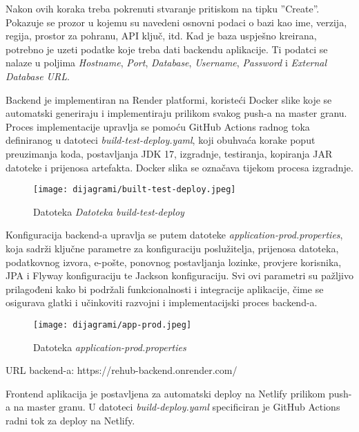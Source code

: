 			\eject
			
			Nakon ovih koraka treba pokrenuti stvaranje pritiskom na tipku ”Create”.
			Pokazuje se prozor u kojemu su navedeni osnovni podaci o bazi kao ime, verzija, regija, prostor za pohranu, API ključ, itd.
			Kad je baza uspješno kreirana, potrebno je uzeti podatke koje treba dati backendu aplikacije. Ti podatci se nalaze u poljima \textit{Hostname}, \textit{Port}, \textit{Database}, \textit{Username}, \textit{Password} i \textit{External Database URL}.
			
			\pagebreak
			
			Backend je implementiran na Render platformi, koristeći Docker slike koje se automatski generiraju i implementiraju prilikom svakog push-a na master granu. Proces implementacije upravlja se pomoću GitHub Actions radnog toka definiranog u datoteci \textit{build-test-deploy.yaml}, koji obuhvaća korake poput preuzimanja koda, postavljanja JDK 17, izgradnje, testiranja, kopiranja JAR datoteke i prijenosa artefakta. Docker slika se označava tijekom procesa izgradnje. 
			
			\begin{figure}[H]
				\texttt{[image: dijagrami/built-test-deploy.jpeg]}
				\centering
				\caption{Datoteka \textit{Datoteka build-test-deploy}}
				\label{fig:built-test-deploy}
			\end{figure}
			
			\eject
			
			Konfiguracija backend-a upravlja se putem datoteke \textit{application-prod.properties}, koja sadrži ključne parametre za konfiguraciju poslužitelja, prijenosa datoteka, podatkovnog izvora, e-pošte, ponovnog postavljanja lozinke, provjere korisnika, JPA i Flyway konfiguraciju te Jackson konfiguraciju. Svi ovi parametri su pažljivo prilagođeni kako bi podržali funkcionalnosti i integracije aplikacije, čime se osigurava glatki i učinkoviti razvojni i implementacijski proces backend-a.
			
			\begin{figure}[H]
				\texttt{[image: dijagrami/app-prod.jpeg]}
				\centering
				\caption{Datoteka \textit{application-prod.properties}}
				\label{fig:app-prod}
			\end{figure}
			
			\eject
			
			URL backend-a: https://rehub-backend.onrender.com/
			
			\pagebreak
			
			Frontend aplikacija je postavljena za automatski deploy na Netlify prilikom push-a na master granu. U datoteci \textit{build-deploy.yaml} specificiran je GitHub Actions radni tok za deploy na Netlify. 	
			
